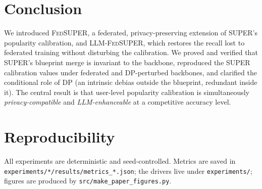 \documentclass{article}
\newcommand{\Fed}{\textsc{FedSUPER}}
\newcommand{\LLMSuper}{\textsc{LLM-FedSUPER}}
\begin{document}
\section{Conclusion}
\label{sec:conclusion}

We introduced \Fed{}, a federated, privacy-preserving extension of SUPER's popularity calibration,
and \LLMSuper{}, which restores the recall lost to federated training without disturbing the
calibration. We proved and verified that SUPER's blueprint merge is invariant to the backbone,
reproduced the SUPER calibration values under federated and DP-perturbed backbones, and clarified
the conditional role of DP (an intrinsic debias outside the blueprint, redundant inside it). The
central result is that user-level popularity calibration is simultaneously
\emph{privacy-compatible} and \emph{LLM-enhanceable} at a competitive accuracy level.

\section*{Reproducibility}
All experiments are deterministic and seed-controlled. Metrics are saved in
\texttt{experiments/*/results/metrics\_*.json}; the drivers live under \texttt{experiments/};
figures are produced by \texttt{src/make\_paper\_figures.py}.



\end{document}
